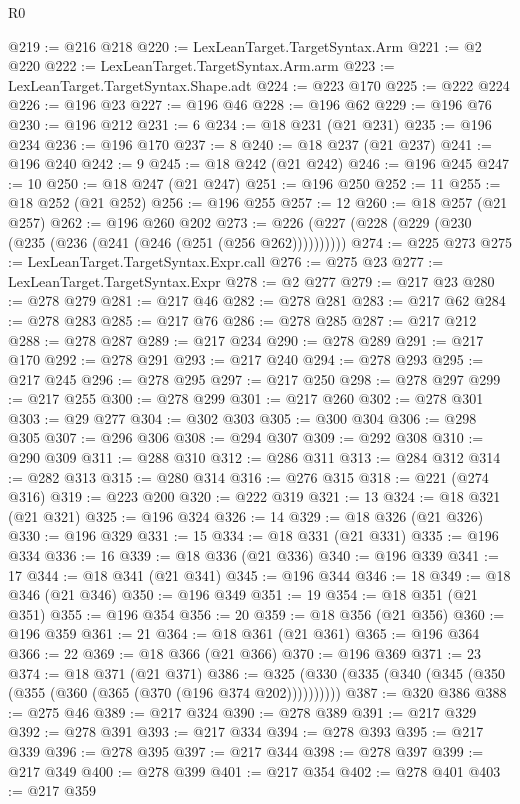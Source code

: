 \begin{lexlean}{R0}
\begin{coremodule}
@219 := @216 @218
@220 := LexLeanTarget.TargetSyntax.Arm
@221 := @2 @220
@222 := LexLeanTarget.TargetSyntax.Arm.arm
@223 := LexLeanTarget.TargetSyntax.Shape.adt
@224 := @223 @170
@225 := @222 @224
@226 := @196 @23
@227 := @196 @46
@228 := @196 @62
@229 := @196 @76
@230 := @196 @212
@231 := 6
@234 := @18 @231 (@21 @231)
@235 := @196 @234
@236 := @196 @170
@237 := 8
@240 := @18 @237 (@21 @237)
@241 := @196 @240
@242 := 9
@245 := @18 @242 (@21 @242)
@246 := @196 @245
@247 := 10
@250 := @18 @247 (@21 @247)
@251 := @196 @250
@252 := 11
@255 := @18 @252 (@21 @252)
@256 := @196 @255
@257 := 12
@260 := @18 @257 (@21 @257)
@262 := @196 @260 @202
@273 := @226 (@227 (@228 (@229 (@230 (@235 (@236 (@241 (@246 (@251 (@256 @262))))))))))
@274 := @225 @273
@275 := LexLeanTarget.TargetSyntax.Expr.call
@276 := @275 @23
@277 := LexLeanTarget.TargetSyntax.Expr
@278 := @2 @277
@279 := @217 @23
@280 := @278 @279
@281 := @217 @46
@282 := @278 @281
@283 := @217 @62
@284 := @278 @283
@285 := @217 @76
@286 := @278 @285
@287 := @217 @212
@288 := @278 @287
@289 := @217 @234
@290 := @278 @289
@291 := @217 @170
@292 := @278 @291
@293 := @217 @240
@294 := @278 @293
@295 := @217 @245
@296 := @278 @295
@297 := @217 @250
@298 := @278 @297
@299 := @217 @255
@300 := @278 @299
@301 := @217 @260
@302 := @278 @301
@303 := @29 @277
@304 := @302 @303
@305 := @300 @304
@306 := @298 @305
@307 := @296 @306
@308 := @294 @307
@309 := @292 @308
@310 := @290 @309
@311 := @288 @310
@312 := @286 @311
@313 := @284 @312
@314 := @282 @313
@315 := @280 @314
@316 := @276 @315
@318 := @221 (@274 @316)
@319 := @223 @200
@320 := @222 @319
@321 := 13
@324 := @18 @321 (@21 @321)
@325 := @196 @324
@326 := 14
@329 := @18 @326 (@21 @326)
@330 := @196 @329
@331 := 15
@334 := @18 @331 (@21 @331)
@335 := @196 @334
@336 := 16
@339 := @18 @336 (@21 @336)
@340 := @196 @339
@341 := 17
@344 := @18 @341 (@21 @341)
@345 := @196 @344
@346 := 18
@349 := @18 @346 (@21 @346)
@350 := @196 @349
@351 := 19
@354 := @18 @351 (@21 @351)
@355 := @196 @354
@356 := 20
@359 := @18 @356 (@21 @356)
@360 := @196 @359
@361 := 21
@364 := @18 @361 (@21 @361)
@365 := @196 @364
@366 := 22
@369 := @18 @366 (@21 @366)
@370 := @196 @369
@371 := 23
@374 := @18 @371 (@21 @371)
@386 := @325 (@330 (@335 (@340 (@345 (@350 (@355 (@360 (@365 (@370 (@196 @374 @202))))))))))
@387 := @320 @386
@388 := @275 @46
@389 := @217 @324
@390 := @278 @389
@391 := @217 @329
@392 := @278 @391
@393 := @217 @334
@394 := @278 @393
@395 := @217 @339
@396 := @278 @395
@397 := @217 @344
@398 := @278 @397
@399 := @217 @349
@400 := @278 @399
@401 := @217 @354
@402 := @278 @401
@403 := @217 @359

\end{coremodule}
\end{lexlean}
